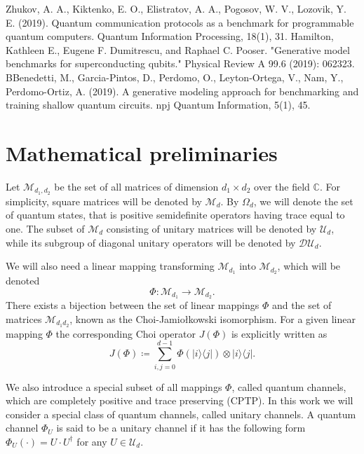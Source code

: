 \documentclass[preprint,12pt, a4paper, dvipsnames]{elsarticle}
\newcommand{\ket}[1]{\ensuremath{|#1\rangle}}
\newcommand{\bra}[1]{\ensuremath{\langle#1|}}
\newcommand{\ketbra}[2]{\ensuremath{\ket{#1}\bra{#2}}}
\newcommand{\1}{{\rm 1\hspace{-0.9mm}l}}
\newcommand{\DD}{\mathcal{D}}
\newcommand{\UU}{\mathcal{U}}
\theoremstyle{definition}
\begin{document}
\begin{thebibliography}{00}
 Zhukov, A. A., Kiktenko, E. O., Elistratov, A. A., Pogosov, W. V.,  Lozovik, Y. E. (2019). Quantum communication protocols as a benchmark for programmable quantum computers. Quantum Information Processing, 18(1), 31.
 Hamilton, Kathleen E., Eugene F. Dumitrescu,
and Raphael C. Pooser. "Generative model benchmarks for superconducting
qubits." Physical Review A 99.6 (2019): 062323.
 BBenedetti, M., Garcia-Pintos, D., Perdomo, O., Leyton-Ortega, V., Nam, Y.,  Perdomo-Ortiz, A. (2019). A generative modeling approach for benchmarking and training shallow quantum circuits. npj Quantum Information, 5(1), 45.

\end{thebibliography}


\appendix


\section{Mathematical preliminaries} \label{app:preliminaries}


Let $\mathcal{M}_{d_1,d_2}$ be the set of all matrices of dimension $d_1 \times d_2$ over
the field $\mathbb{C}$. For  simplicity, square matrices will be denoted by
$\mathcal{M}_d$.
By $\Omega_d$, we will denote the set of quantum states, that is
positive semidefinite operators having trace equal to one.
The subset of $\mathcal{M}_d$ consisting of unitary matrices will be denoted
by $\UU_d$, while its subgroup of diagonal unitary operators will be denoted by
$\DD \UU_d$.


We will also need a linear mapping transforming $\mathcal{M}_{d_1}$ into
$\mathcal{M}_{d_2}$, which will be denoted
\begin{equation}
\Phi: \mathcal{M}_{d_1 } \rightarrow \mathcal{M}_{d_2}.
\end{equation}
There
exists a bijection between the set of linear mappings $\Phi$ and the set of matrices $\mathcal{M}_{d_1d_2}$,  known as the Choi-Jamio{\l}kowski isomorphism.
For a given linear mapping $\Phi$ the corresponding Choi operator $J(\Phi)$ is explicitly written as
\begin{equation}
J(\Phi) \coloneqq \sum_{i,j=0}^{d- 1} \Phi(\ketbra{i}{j}) \otimes \ketbra{i}{j}. \end{equation}

We also introduce a special subset of all mappings $\Phi$, called quantum channels, which are completely positive
and trace preserving (CPTP).
In this work we will consider a special class of quantum channels, called unitary channels.  A
quantum channel
$\Phi_{U}$ is said to be a unitary channel if it has the following form $\Phi_U(\cdot) = U \cdot U^\dagger$ for any $U \in
\UU_d$.
\end{document}
